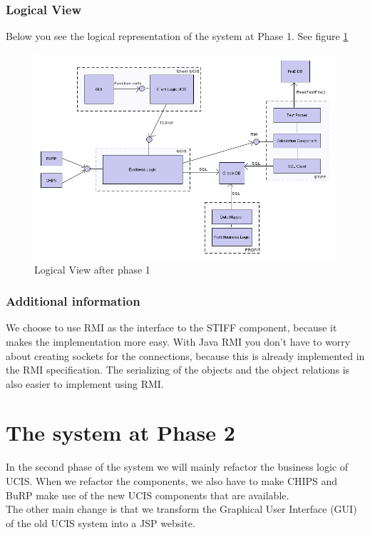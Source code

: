 \subsubsection{Logical View}
Below you see the logical representation of the system at Phase 1. See figure \ref{fig:logical_phase1}
\begin{figure}[ht]
	\centering
		\includegraphics[width=1.00\textwidth]{img/logical-phase1.png}
	\caption{Logical View after phase 1}
	\label{fig:logical_phase1}
\end{figure}

\subsubsection{Additional information}
We choose to use RMI as the interface to the STIFF component, because it makes the implementation
more easy. With Java RMI you don't have to worry about creating sockets for the connections,
because this is already implemented in the RMI specification. The serializing of the objects 
and the object relations is also easier to implement using RMI.



\section{The system at Phase 2}
In the second phase of the system we will mainly refactor the business logic of UCIS.
When we refactor the components, we also have to make CHIPS and BuRP make use of the new
UCIS components that are available.\\
The other main change is that we transform the Graphical User Interface (GUI) of the old
UCIS system into a JSP website.

